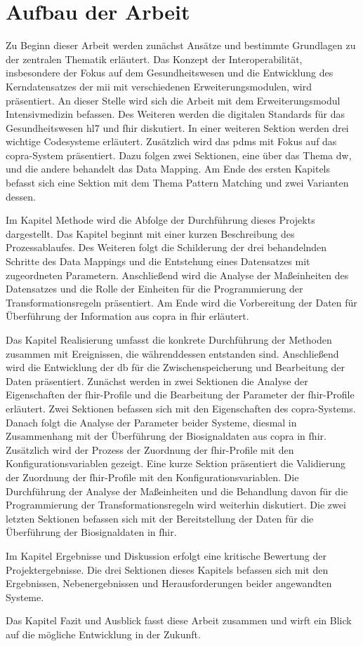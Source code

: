 \section{Aufbau der Arbeit} \label{sec:structure}

Zu Beginn dieser Arbeit werden zunächst Ansätze und bestimmte Grundlagen zu der zentralen Thematik erläutert. Das Konzept der Interoperabilität, insbesondere der Fokus auf dem Gesundheitswesen und die Entwicklung des Kerndatensatzes der \ac{mii} mit verschiedenen Erweiterungsmodulen, wird präsentiert. An dieser Stelle wird sich die Arbeit mit dem Erweiterungsmodul Intensivmedizin befassen. Des Weiteren werden die digitalen Standards für das Gesundheitswesen \ac{hl7} und \ac{fhir} diskutiert. In einer weiteren Sektion werden drei wichtige Codesysteme erläutert. Zusätzlich wird das \ac{pdms} mit Fokus auf das \ac{copra}-System präsentiert. Dazu folgen zwei Sektionen, eine über das Thema \ac{dw}, und die andere behandelt das Data Mapping. Am Ende des ersten Kapitels befasst sich eine Sektion mit dem Thema Pattern Matching und zwei Varianten dessen.

Im Kapitel \glqq Methode\grqq{} wird die Abfolge der Durchführung dieses Projekts dargestellt. Das Kapitel beginnt mit einer kurzen Beschreibung des Prozessablaufes. Des Weiteren folgt die Schilderung der drei behandelnden Schritte des Data Mappings und die Entstehung eines Datensatzes mit zugeordneten Parametern. Anschließend wird die Analyse der Maßeinheiten des Datensatzes und die Rolle der Einheiten für die Programmierung der Transformationsregeln präsentiert. Am Ende wird die Vorbereitung der Daten für Überführung der Information aus \ac{copra} in \ac{fhir} erläutert.

Das Kapitel \glqq Realisierung\grqq{} umfasst die konkrete Durchführung der Methoden zusammen mit Ereignissen, die währenddessen entstanden sind. Anschließend wird die Entwicklung der \ac{db} für die Zwischenspeicherung und Bearbeitung der Daten präsentiert. Zunächst werden in zwei Sektionen die Analyse der Eigenschaften der \ac{fhir}-Profile und die Bearbeitung der Parameter der \ac{fhir}-Profile erläutert. Zwei Sektionen befassen sich mit den Eigenschaften des \ac{copra}-Systems. Danach folgt die Analyse der Parameter beider Systeme, diesmal in Zusammenhang mit der Überführung der Biosignaldaten aus \ac{copra} in \ac{fhir}. Zusätzlich wird der Prozess der Zuordnung der \ac{fhir}-Profile mit den Konfigurationsvariablen gezeigt. Eine kurze Sektion präsentiert die Validierung der Zuordnung der \ac{fhir}-Profile mit den Konfigurationsvariablen. Die Durchführung der Analyse der Maßeinheiten und die Behandlung davon für die Programmierung der Transformationsregeln wird weiterhin diskutiert. Die zwei letzten Sektionen befassen sich mit der Bereitstellung der Daten für die Überführung der Biosignaldaten in \ac{fhir}.

Im Kapitel \glqq Ergebnisse und Diskussion\grqq{} erfolgt eine kritische Bewertung der Projektergebnisse. Die drei Sektionen dieses Kapitels befassen sich mit den Ergebnissen, Nebenergebnissen und Herausforderungen beider angewandten Systeme.

Das Kapitel \glqq Fazit und Ausblick\grqq{} fasst diese Arbeit zusammen und wirft ein Blick auf die mögliche Entwicklung in der Zukunft.